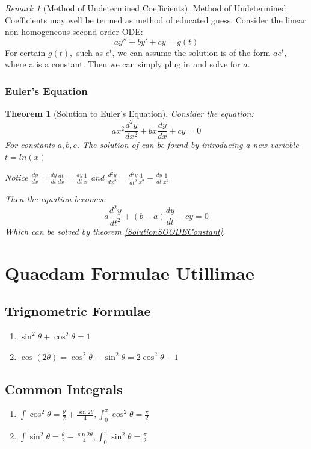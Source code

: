 \documentclass[12pt,a4paper]{article}
\newtheorem{theorem}{Theorem}[subsection]
\theoremstyle{definition}
\theoremstyle{remark}
\newtheorem{remark}{Remark}[section]
\begin{document}
\begin{remark}[Method of Undetermined Coefficients]
	Method of Undetermined Coefficients may well be termed as method of educated guess.
	Consider the linear non-homogeneous second order ODE:
\begin{equation}\label{eq:2NHOMOODE}
	ay'' + by' + cy = g(t)
\end{equation}
For certain $g(t),$ such as $e^t$, we can assume the solution is of the form $ae^t,$ where a is a constant. Then we can simply plug in and solve for $a.$

\end{remark}

\subsubsection{Euler's Equation}
\begin{theorem}[Solution to Euler's Equation]
	Consider the equation:
\[
	ax^2 \frac{d^2y}{dx^2} + bx \frac{dy}{dx} + cy = 0
\]
For constants $a,b,c$. The solution of can be found by introducing a new variable $t = ln(x)$

Notice $ \frac{dy}{dx} = \frac{dy}{dt} \frac{dt}{dx} = \frac{dy}{dt} \frac{1}{x}$
and $ \frac{d^2y}{dx^2} = \frac{d^2y}{dt^2} \frac{1}{x^2} - \frac{dy}{dt} \frac{1}{x^2}$

Then the equation becomes:
\[
	a\frac{d^2y}{dt^2} + (b-a)\frac{dy}{dt} + cy = 0
\]
Which can be solved by theorem \ref{SolutionSOODEConstant}.
\end{theorem}










\newpage

\section{Quaedam Formulae Utillimae}
\subsection{Trignometric Formulae}
\begin{enumerate}
\item $\sin^2{\theta} + \cos^2{\theta} = 1$
\item $\cos(2\theta) = \cos^2{\theta} - \sin^2{\theta} = 2\cos^2{\theta} - 1$

\end{enumerate}
\subsection{Common Integrals}
\begin{enumerate}
	\item $\int \cos^2{\theta} = \frac{\theta}{2} + \frac{\sin{2\theta}}{4}, \int_0^{\pi} \cos^2{\theta} = \frac{\pi}{2} $
	\item $\int \sin^2{\theta} = \frac{\theta}{2} - \frac{\sin{2\theta}}{4},  \int_0^{\pi} \sin^2{\theta} = \frac{\pi}{2} $
\end{enumerate}
\end{document}
